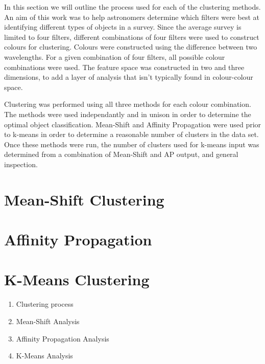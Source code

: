 In this section we will outline the process used for each of the clustering methods.
An aim of this work was to help astronomers determine which filters were best at identifying different types of objects in a survey. 
Since the average survey is limited to four filters, different combinations of four filters were used to construct colours for clustering. 
Colours were constructed using the difference between two wavelengths. For a given combination of four filters, all possible colour combinations were used. %
The feature space was constructed in two and three dimensions, to add a layer of analysis that isn't typically found in colour-colour space.

Clustering was performed using all three methods for each colour combination. 
The methods were used independantly and in unison in order to determine the optimal object classification.
Mean-Shift and Affinity Propagation were used prior to k-means in order to determine a reasonable number of clusters in the data set.
Once these methods were run, the number of clusters used for k-means input was determined from a combination of Mean-Shift and AP output, and general inspection.

\section{Mean-Shift Clustering}
\section{Affinity Propagation}
\section{K-Means Clustering}
\begin{enumerate}
\item Clustering process
\item Mean-Shift Analysis 
\item Affinity Propagation Analysis 
\item K-Means Analysis
\end{enumerate}